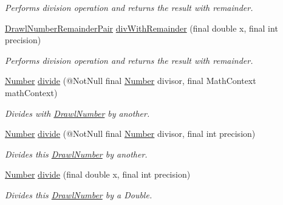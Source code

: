 \begin{DoxyCompactItemize}
\begin{DoxyCompactList}\small\item\em Performs division operation and returns the result with remainder. \end{DoxyCompactList}\item 
\hyperlink{classcom_1_1aarrelaakso_1_1drawl_1_1_drawl_number_remainder_pair}{Drawl\+Number\+Remainder\+Pair} \hyperlink{interfacecom_1_1aarrelaakso_1_1drawl_1_1_number_ae3fd76a012e2afc4d71a3ccb93bace92}{div\+With\+Remainder} (final double x, final int precision)
\begin{DoxyCompactList}\small\item\em Performs division operation and returns the result with remainder. \end{DoxyCompactList}\item 
\hyperlink{interfacecom_1_1aarrelaakso_1_1drawl_1_1_number}{Number} \hyperlink{interfacecom_1_1aarrelaakso_1_1drawl_1_1_number_adfd6e1a6e96cbface21eef9b2d8860d0}{divide} (@Not\+Null final \hyperlink{interfacecom_1_1aarrelaakso_1_1drawl_1_1_number}{Number} divisor, final Math\+Context math\+Context)
\begin{DoxyCompactList}\small\item\em Divides with \hyperlink{classcom_1_1aarrelaakso_1_1drawl_1_1_drawl_number}{Drawl\+Number} by another. \end{DoxyCompactList}\item 
\hyperlink{interfacecom_1_1aarrelaakso_1_1drawl_1_1_number}{Number} \hyperlink{interfacecom_1_1aarrelaakso_1_1drawl_1_1_number_acfcd993a82faa41956430086986084e7}{divide} (@Not\+Null final \hyperlink{interfacecom_1_1aarrelaakso_1_1drawl_1_1_number}{Number} divisor, final int precision)
\begin{DoxyCompactList}\small\item\em Divides this \hyperlink{classcom_1_1aarrelaakso_1_1drawl_1_1_drawl_number}{Drawl\+Number} by another. \end{DoxyCompactList}\item 
\hyperlink{interfacecom_1_1aarrelaakso_1_1drawl_1_1_number}{Number} \hyperlink{interfacecom_1_1aarrelaakso_1_1drawl_1_1_number_aa4a70324e7a3dfd7da7fae72cb7fe5b5}{divide} (final double x, final int precision)
\begin{DoxyCompactList}\small\item\em Divides this \hyperlink{classcom_1_1aarrelaakso_1_1drawl_1_1_drawl_number}{Drawl\+Number} by a Double. \end{DoxyCompactList}\item 

\end{DoxyCompactItemize}
